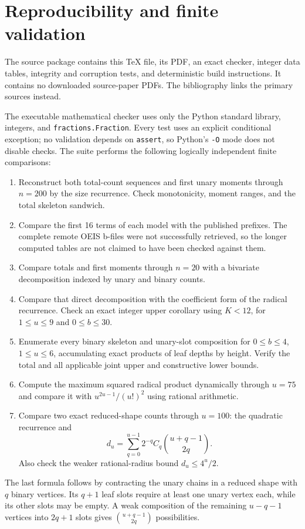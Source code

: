 \documentclass[11pt,a4paper]{article}
\numberwithin{equation}{section}
\theoremstyle{remark}
\begin{document}
\section{Reproducibility and finite validation}\label{lam:bg:sec:checks}
The source package contains this \TeX{} file, its PDF, an exact checker, integer data tables, integrity and corruption tests, and deterministic build instructions. It contains no downloaded source-paper PDFs. The bibliography links the primary sources instead.

The executable mathematical checker uses only the Python standard library, integers, and \texttt{fractions.Fraction}. Every test uses an explicit conditional exception; no validation depends on \texttt{assert}, so Python's \texttt{-O} mode does not disable checks. The suite performs the following logically independent finite comparisons:
\begin{enumerate}
 \item Reconstruct both total-count sequences and first unary moments through $n=200$ by the size recurrence. Check monotonicity, moment ranges, and the total skeleton sandwich.
 \item Compare the first 16 terms of each model with the published prefixes. The complete remote OEIS b-files were not successfully retrieved, so the longer computed tables are not claimed to have been checked against them.
 \item Compare totals and first moments through $n=20$ with a bivariate decomposition indexed by unary and binary counts.
 \item Compare that direct decomposition with the coefficient form of the radical recurrence. Check an exact integer upper corollary using $K<12$, for $1\le u\le9$ and $0\le b\le30$.
 \item Enumerate every binary skeleton and unary-slot composition for $0\le b\le4$, $1\le u\le6$, accumulating exact products of leaf depths by height. Verify the total and all applicable joint upper and constructive lower bounds.
 \item Compute the maximum squared radical product dynamically through $u=75$ and compare it with $u^{2u-1}/(u!)^2$ using rational arithmetic.
 \item Compare two exact reduced-shape counts through $u=100$: the quadratic recurrence and
 \[
 d_u=\sum_{q=0}^{u-1}2^{-q}C_q\binom{u+q-1}{2q}.
 \]
 Also check the weaker rational-radius bound $d_u\le4^u/2$.
\end{enumerate}
The last formula follows by contracting the unary chains in a reduced shape with $q$ binary vertices. Its $q+1$ leaf slots require at least one unary vertex each, while its other slots may be empty. A weak composition of the remaining $u-q-1$ vertices into $2q+1$ slots gives $\binom{u+q-1}{2q}$ possibilities.
\end{document}
